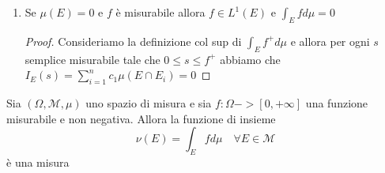 \begin{enumerate}[label = \arabic*.]
    \begin{proof}
        Abbiamo che \(\int_E f^{+} d\mu\) e \(\int_E f^{-} d\mu\) sono entrambi
        finiti e \[\int_A f^{+} d\mu = \int_E f^{+} \rchi_A d\mu \le \int_E
        f^{+} d\mu\] Similmente per \(f^{-}\).
    \end{proof}
    \item Se \(\mu(E) = 0\) e \(f\) è misurabile allora \(f \in L^{1}(E)\) e
        \(\int_E f d\mu = 0\)
    \begin{proof}
        Consideriamo la definizione col sup di \(\int_E f^{+} d\mu\) e allora
        per ogni \(s\) semplice misurabile tale che \(0 \le s \le f^{+}\)
        abbiamo che \\\(I_E(s) = \sum_{i=1}^{n} c_{1} \mu(E \cap E_{i}) = 0 \) 
    \end{proof}

\end{enumerate}
\begin{theorem}
    Sia \((\Omega, \mathcal{M}, \mu)\) uno spazio di misura e sia \(f : \Omega
    -> [0, +\infty]\) una funzione misurabile e non negativa. Allora la funzione
    di insieme 
    \[
        \nu(E) = \int_E f d\mu \quad \forall E \in \mathcal{M}
    \]
    è una misura
\end{theorem}
